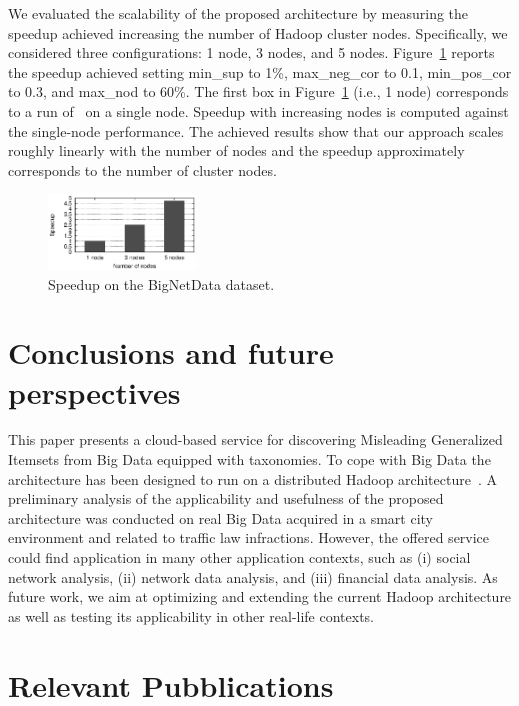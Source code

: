 We evaluated the scalability of the proposed architecture by measuring the speedup achieved increasing the number of Hadoop cluster nodes.
Specifically, we considered three configurations: 1 node, 3 nodes, and 5 nodes.
Figure~\ref{fig:speedup} reports the speedup achieved setting min\_sup to 1\%, max\_neg\_cor to 0.1, min\_pos\_cor to 0.3, and 
max\_nod to 60\%. 
The first box in Figure~\ref{fig:speedup} (i.e., 1 node) corresponds
to a run of \SeTAB\ on a single node. Speedup with increasing nodes is computed against the single-node performance. 
The achieved results show that our approach scales roughly linearly with the number of nodes and the speedup 
approximately corresponds to the number of cluster nodes. 

\begin{figure}[t]
\centering
\includegraphics[width=0.35\textwidth]{chapters/mgi/grafici/graficoSpeedup.eps}
\caption{Speedup on the BigNetData dataset.}
\label{fig:speedup}
\end{figure}


\section{Conclusions and future perspectives}
\label{conclusion}
This paper presents a cloud-based service for discovering Misleading Generalized Itemsets from Big Data equipped with taxonomies.
To cope with Big Data the architecture has been designed to run on a distributed Hadoop architecture~\cite{Dean2008}.
A preliminary analysis of the applicability and usefulness of the proposed architecture was conducted on real Big Data 
acquired in a smart city environment and related to traffic law infractions.
However, the offered service could find application in many other application contexts, such as (i) social network analysis, 
(ii) network data analysis, and (iii) financial data analysis. 
As future work, we aim at optimizing and extending the current Hadoop architecture as well as testing its applicability in other real-life contexts. 

\section{Relevant Pubblications}


